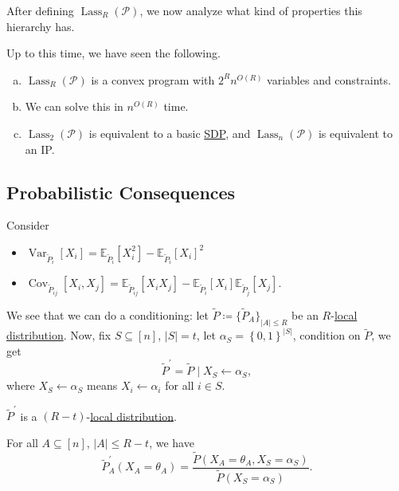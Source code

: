 After defining \(\mathop{\mathrm{Lass}}_R(\mathcal{P} )\), we now analyze what kind of properties this hierarchy has.

\begin{remark}
	Up to this time, we have seen the following.
	\begin{enumerate}[(a)]
		\item \(\mathop{\mathrm{Lass}}_R(\mathcal{P})\) is a convex program with \(2^R n^{O(R)}\) variables and constraints.
		\item We can solve this in \(n^{O(R)}\) time.
		\item \(\mathop{\mathrm{Lass}}_2(\mathcal{P})\) is equivalent to a basic \hyperref[def:SDP]{SDP}, and \(\mathop{\mathrm{Lass}}_n(\mathcal{P})\) is equivalent to an IP.
	\end{enumerate}
\end{remark}


\subsection{Probabilistic Consequences}
Consider
\begin{itemize}
	\item \(\mathop{\mathrm{Var}}_{\widetilde{P} _i}\left[ X_i \right] = \mathbb{E}_{\widetilde{P} _i}\left[ X_i ^{2} \right] - \mathbb{E}_{\widetilde{P} _i}\left[ X_i \right]^{2}  \)
	\item \(\mathop{\mathrm{Cov}}_{\widetilde{P} _{ij}}\left[ X_i, X_j\right] = \mathbb{E}_{\widetilde{P} _{ij}}\left[ X_i X_j\right] - \mathbb{E}_{\widetilde{P} _{i}}\left[ X_i \right] \mathbb{E}_{\widetilde{P} _{j}}\left[ X_j\right]  \).
\end{itemize}
We see that we can do a conditioning: let \(\widetilde{P} \coloneqq \{ \widetilde{P} _{A} \} _{\left\vert A \right\vert \leq R}\) be an \(R\)-\hyperref[def:local-distribution]{local distribution}. Now, fix \(S \subseteq [n]\), \(\left\vert S \right\vert = t\), let \(\alpha _S = \left\{ 0, 1 \right\} ^{\left\vert S \right\vert }\), condition on \(\widetilde{P} \), we get
\[
	\widetilde{P} ^\prime = \widetilde{P} \mid X_S \gets \alpha _S,
\]
where \(X_S\gets \alpha _S\) means \(X_i \gets \alpha _i\) for all \(i\in S\).
\begin{remark}
	\(\widetilde{P} ^\prime \) is a \((R-t)\)-\hyperref[def:local-distribution]{local distribution}.
\end{remark}
\begin{explanation}
	For all \(A \subseteq [n]\), \(\left\vert A \right\vert \leq R-t\), we have
	\[
		\widetilde{P} ^\prime _A (X_A = \theta _A) = \frac{\widetilde{P} (X_A = \theta _A, X_S = \alpha _S)}{\widetilde{P} (X_S = \alpha _S)}.
	\]
\end{explanation}

